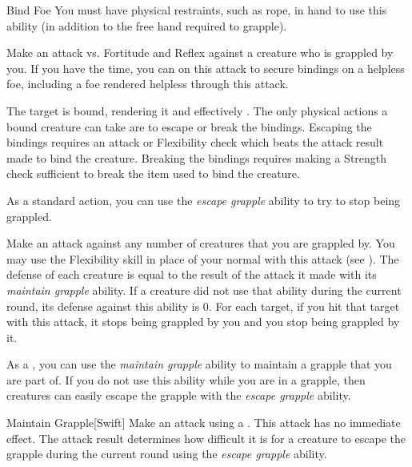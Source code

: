             \begin{freeability}{Bind Foe}
                You must have physical restraints, such as rope, in hand to use this ability (in addition to the free hand required to grapple).

                Make an attack vs. Fortitude and Reflex against a creature who is grappled by you.
                If you have the time, you can  on this attack to secure bindings on a helpless foe, including a foe rendered helpless through this attack.

                \hit The target is bound, rendering it  and effectively .
                The only physical actions a bound creature can take are to escape or break the bindings.
                Escaping the bindings requires an attack or Flexibility check which beats the attack result made to bind the creature.
                Breaking the bindings requires making a Strength check sufficient to break the item used to bind the creature.
            \end{freeability}

             As a standard action, you can use the \textit{escape grapple} ability to try to stop being grappled.

            \begin{freeability}{}
                Make an attack against any number of creatures that you are grappled by.
                You may use the Flexibility skill in place of your normal  with this attack (see ).
                The defense of each creature is equal to the result of the attack it made with its \textit{maintain grapple} ability.
                If a creature did not use that ability during the current round, its defense against this ability is 0.
                For each target, if you hit that target with this attack, it stops being grappled by you and you stop being grappled by it.
            \end{freeability}

             As a , you can use the \textit{maintain grapple} ability to maintain a grapple that you are part of.
            If you do not use this ability while you are in a grapple, then creatures can easily escape the grapple with the \textit{escape grapple} ability.
            \begin{freeability}{Maintain Grapple}[Swift]
                Make an attack using a .
                This attack has no immediate effect.
                The attack result determines how difficult it is for a creature to escape the grapple during the current round using the \textit{escape grapple} ability.
            \end{freeability}


